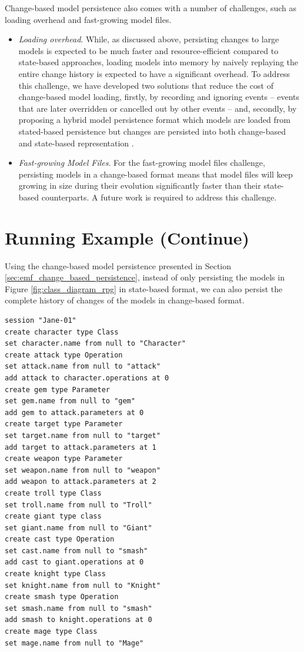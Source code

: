 Change-based model persistence also comes with a number of challenges, such as loading overhead and fast-growing model files. 
\begin{itemize}
\item \emph{Loading overhead}. While, as discussed above, persisting changes to large models is expected to be much faster and resource-efficient compared to state-based approaches, loading models into memory by naively replaying the entire change history is expected to have a significant overhead. To address this challenge, we have developed two solutions that reduce the cost of change-based model loading, firstly, by recording and ignoring events -- events that are later overridden or cancelled out by other events -- \cite{yohannis2018towards} and, secondly, by proposing a hybrid model persistence format which models are loaded from stated-based persistence but changes are persisted into both change-based and state-based representation \cite{DBLP:conf/models/YohannisRPK18}. 
\item \emph{Fast-growing Model Files}. For the fast-growing model files challenge, persisting models in a change-based format means that model files will keep growing in size during their evolution significantly faster than their state-based counterparts. A future work is required to address this challenge.     
\end{itemize}
  
  

\section{Running Example (Continue)}
\label{sec:runnnig_example_continue}
Using the change-based model persistence presented in Section \ref{sec:emf_change_based_persistence}, instead of only persisting the models in Figure \ref{fig:class_diagram_rpg} in state-based format, we can also persist the complete history of changes of the models in change-based format. 

\vspace{-20pt}
\begin{lstlisting}[style=eol,caption={Change-based representation of the original version in Figure \ref{fig:class_diagram_origin}.},label=lst:cbp_origin]
session "Jane-01"
create character type Class
set character.name from null to "Character" 
create attack type Operation
set attack.name from null to "attack" 
add attack to character.operations at 0
create gem type Parameter
set gem.name from null to "gem" 
add gem to attack.parameters at 0
create target type Parameter
set target.name from null to "target" 
add target to attack.parameters at 1
create weapon type Parameter
set weapon.name from null to "weapon" 
add weapon to attack.parameters at 2
create troll type Class
set troll.name from null to "Troll" 
create giant type class
set giant.name from null to "Giant"
create cast type Operation
set cast.name from null to "smash"
add cast to giant.operations at 0
create knight type Class
set knight.name from null to "Knight"
create smash type Operation
set smash.name from null to "smash"
add smash to knight.operations at 0
create mage type Class
set mage.name from null to "Mage" 
\end{lstlisting}

